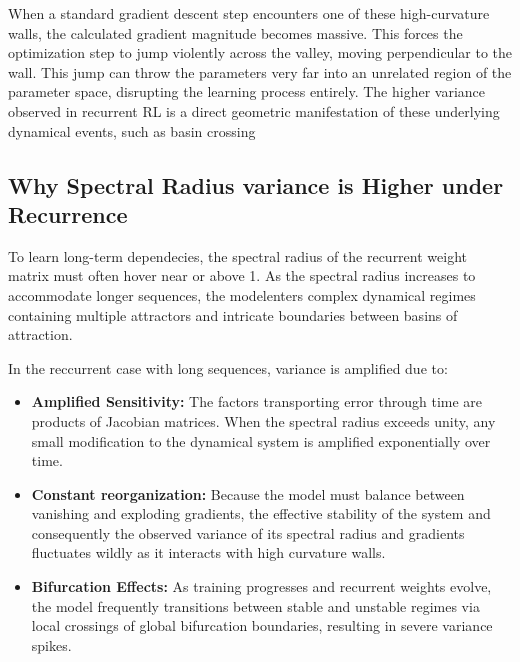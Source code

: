 \documentclass[11pt,a4paper]{article}
\begin{document}
When a standard gradient descent step encounters one of these high-curvature walls, the calculated gradient magnitude becomes massive. This forces the optimization step to jump violently across the valley, moving perpendicular to the wall. This jump can throw the parameters very far into an unrelated region of the parameter space, disrupting the learning process entirely. The higher variance observed in recurrent RL is a direct geometric manifestation of these underlying dynamical events, such as basin crossing

\subsection{Why Spectral Radius variance is Higher under Recurrence}

To learn long-term dependecies, the spectral radius of the recurrent weight matrix must often hover near or above 1. As the spectral radius increases to accommodate longer sequences, the modelenters complex dynamical regimes containing multiple attractors and intricate boundaries between basins of attraction. 

In the reccurrent case with long sequences, variance is amplified due to: 

\begin{itemize}
    \item \textbf{Amplified Sensitivity:} The factors transporting error through time are products of Jacobian matrices. When the spectral radius exceeds unity, any small modification to the dynamical system is amplified exponentially over time. 
    \item \textbf{Constant reorganization:} Because the model must balance between vanishing and exploding gradients, the effective stability of the system and consequently the observed variance of its spectral radius and gradients fluctuates wildly as it interacts with high curvature walls. 
    \item \textbf{Bifurcation Effects:} As training progresses and recurrent weights evolve, the model frequently transitions between stable and unstable regimes via local crossings of global bifurcation boundaries, resulting in severe variance spikes. 
\end{itemize}
\end{document}
